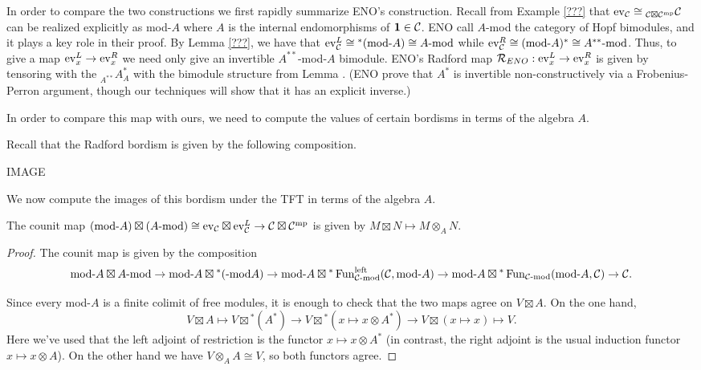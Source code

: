 \documentclass{amsart}
\begin{document}
In order to compare the two constructions we first rapidly summarize ENO's construction.  Recall from Example \ref{???} that $\mathrm{ev}_\mathcal C \cong {}_{\mathcal C \boxtimes \mathcal C^{\mathrm{mp}}}\mathcal C$ can be realized explicitly as mod-$A$ where $A$ is the internal endomorphisms of $\mathbf{1} \in \mathcal C$. 
ENO call $A$-mod the category of Hopf bimodules, and it plays a key role in their proof.  By Lemma \ref{???}, we have that $\mathrm{ev}_\mathcal C^L \cong {}^*(\text{mod-}A) \cong A\text{-mod}$ while $\mathrm{ev}_\mathcal C^R \cong (\text{mod-}A)^* \cong A^{**}\text{-mod}$.  Thus, to give a map $\mathrm{ev}_x^L \rightarrow \mathrm{ev}_x^R$ we need only give an invertible $A^{**}$-mod-$A$ bimodule.  ENO's Radford map $\mathcal R_{ENO}: \mathrm{ev}_x^L \rightarrow \mathrm{ev}_x^R$ is given by tensoring with the ${}_{A^{**}}A^*_A$ with the bimodule structure from Lemma \cite{???}.  (ENO prove that $A^*$ is invertible non-constructively via a Frobenius-Perron argument, though our techniques will show that it has an explicit inverse.)


In order to compare this map with ours, we need to compute the values of certain bordisms in terms of the algebra $A$.

Recall that the Radford bordism is given by the following composition.

IMAGE

We now compute the images of this bordism under the TFT in terms of the algebra $A$.

\begin{lemma}
The counit map $(\text{mod-}A) \boxtimes (A\text{-mod}) \cong \mathrm{ev}_\mathcal C \boxtimes \mathrm{ev}_\mathcal C^L \rightarrow \mathcal C \boxtimes \mathcal C^{\mathrm{mp}}$ is given by $M \boxtimes N \mapsto M \otimes_A N$.
\end{lemma}
\begin{proof}
The counit map is given by the composition 
$$\text{mod-}A \boxtimes A\text{-mod} \rightarrow \text{mod-}A \boxtimes {}^*(\text{-mod}A) \rightarrow \text{mod-}A \boxtimes {}^*\operatorname{Fun}_{\mathcal C\text{-mod}}^{\text{left}}(\mathcal C, \text{mod-}A) \rightarrow \text{mod-}A \boxtimes {}^*\operatorname{Fun}_{\mathcal C\text{-mod}}(\text{mod-}A, \mathcal C) \rightarrow \mathcal C.$$

Since every mod-$A$ is a finite colimit of free modules, it is enough to check that the two maps agree on $V \boxtimes A$.  On the one hand,
$$V \boxtimes A \mapsto V \boxtimes {}^*(A^*) \rightarrow V \boxtimes {}^*(x \mapsto x \otimes A^*) \rightarrow V \boxtimes (x \mapsto x) \mapsto V.$$  Here we've used that the left adjoint of restriction is the functor $x \mapsto x \otimes A^*$ (in contrast, the right adjoint is the usual induction functor $x \mapsto x \otimes A$).  On the other hand we have $V \otimes_A A \cong V$, so both functors agree.
\end{proof}
\end{document}
